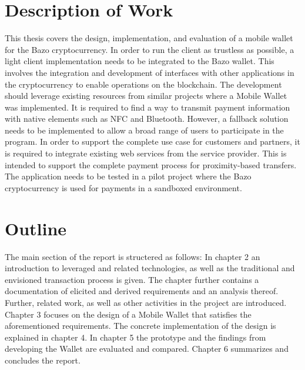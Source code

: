 \section{Description of Work}
This thesis covers the design, implementation, and evaluation of a mobile wallet for the Bazo cryptocurrency. In order to run the client as trustless as possible, a light client implementation needs to be integrated to the Bazo wallet. This involves the integration and development of interfaces with other applications in the cryptocurrency to enable operations on the blockchain.
The development should leverage existing resources from similar projects where a Mobile Wallet was implemented.
It is required to find a way to transmit payment information with native elements such as NFC and Bluetooth. However, a fallback solution needs to be implemented to allow a broad range of users to participate in the program.
In order to support the complete use case for customers and partners, it is required to integrate existing web services from the service provider. This is intended to support the complete payment process for proximity-based transfers.
The application needs to be tested in a pilot project where the Bazo cryptocurrency is used for payments in a sandboxed environment.

\section{Outline}
The main section of the report is structered as follows:
In chapter 2 an introduction to leveraged and related technologies, as well as the traditional and envisioned transaction process is given. The chapter further contains a documentation of elicited and derived requirements and an analysis thereof. Further, related work, as well as other activities in the project are introduced. Chapter 3 focuses on the design of a Mobile Wallet that satisfies the aforementioned requirements. The concrete implementation of the design is explained in chapter 4. In chapter 5 the prototype and the findings from developing the Wallet are evaluated and compared.
Chapter 6 summarizes and concludes the report.